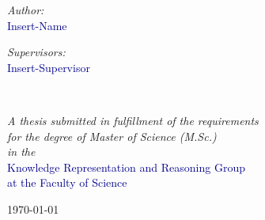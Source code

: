 \begin{titlepage}
\begin{center}
    \vspace*{.005\textheight}
    \begin{minipage}[t]{0.4\textwidth}
    \begin{flushleft} \large
    \emph{Author:}\\
    {\textcolor{darkblue}{Insert-Name}}\\
    \end{flushleft}
    \end{minipage}
    \begin{minipage}[t]{0.4\textwidth}
    \begin{flushright} \large
    \emph{Supervisors:} \\
    {\textcolor{darkblue}{Insert-Supervisor}}
    \end{flushright}
    \end{minipage}\\[2.3cm]
     
    \vfill
    
    \large \textit{A thesis submitted in fulfillment of the requirements\\ for the degree of Master of Science (M.Sc.)}\\[0.3cm]
    \textit{in the}\\[0.4cm]
    \textcolor{darkblue}{Knowledge Representation and Reasoning Group \\ at the Faculty of Science } \\[1cm]
     
    \vfill
    
    {\large \today}\\[4cm]
     
    \vfill
    \end{center}
    \end{titlepage}